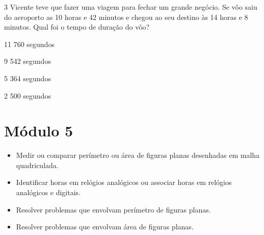 \num{3} Vicente teve que fazer uma viagem para fechar um grande negócio. Se
vôo saiu do aeroporto as 10 horas e 42 minutos e chegou ao seu destino
às 14 horas e 8 minutos. Qual foi o tempo de duração do vôo?

\begin{escolha}
\item
  11 760 segundos
\item
  9 542 segundos
\item
  5 364 segundos
\item
  2 500 segundos
\end{escolha}


\chapter{Módulo 5}


\begin{itemize}
\item Medir ou comparar perímetro ou área de figuras planas desenhadas em
malha quadriculada.

\item Identificar horas em relógios analógicos ou associar horas em relógios
analógicos e digitais.

\item Resolver problemas que envolvam perímetro de figuras planas.

\item Resolver problemas que envolvam área de figuras planas.
\end{itemize}

